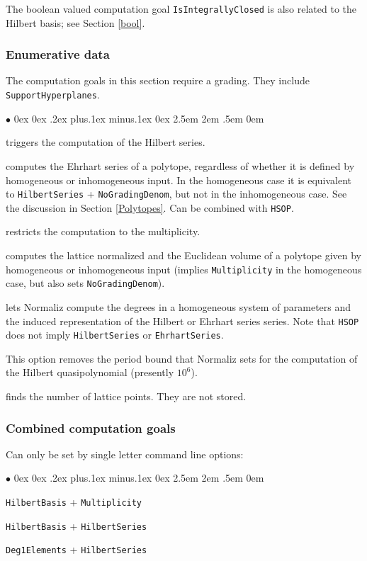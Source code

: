 \documentclass[12pt,a4paper]{scrartcl}
\newcommand{\stdli}{ \topsep0ex \partopsep0ex %
\parsep.2ex plus.1ex minus.1ex \itemsep0ex%
\leftmargin2.5em \labelwidth2em \labelsep.5em \rightmargin0em}%
\renewenvironment{itemize}{\begin{list}{{$\bullet$}}{\stdli}}{\end{list}}
\theoremstyle{definition}
\def\itemtt[#1]{\item[\textbf{\ttt{#1}}]}
\def\ttt{\texttt}
\begin{document}
The boolean valued computation goal \verb|IsIntegrallyClosed| is also related to the Hilbert basis; see Section \ref{bool}.

\subsubsection{Enumerative data}

The computation goals in this section require a grading. They include \verb|SupportHyperplanes|.

\begin{itemize}
	\itemtt [HilbertSeries,-q] triggers the computation of the Hilbert series.
	
	\itemtt[EhrhartSeries] computes the Ehrhart series of a polytope, regardless of whether it is defined by homogeneous or inhomogeneous input. In the homogeneous case it is equivalent to \verb|HilbertSeries| + \verb|NoGradingDenom|, but not in the inhomogeneous case. See the discussion in Section \ref{Polytopes}. Can be combined with \verb|HSOP|.
	
	\itemtt[Multiplicity, -v] restricts the computation to the multiplicity.
	
	\itemtt[Volume, -V] computes the lattice normalized and the Euclidean volume of a polytope given by homogeneous or inhomogeneous input (implies \verb|Multiplicity| in the homogeneous case, but also sets \verb|NoGradingDenom|). 
	
	\itemtt[HSOP] lets Normaliz compute the degrees in a homogeneous system of parameters and the induced representation of the Hilbert or Ehrhart series  series. Note that \ttt{HSOP} does not imply \ttt{HilbertSeries} or \ttt{EhrhartSeries}.
	
	\itemtt[NoPeriodBound] This option removes the period bound that Normaliz sets for the computation of the Hilbert quasipolynomial (presently $10^6$).
	
	\itemtt[NumberLatticePoints] finds the number of lattice points. They are not stored.
\end{itemize}

\subsubsection{Combined computation goals}

Can only be set by single letter command line options:

\begin{itemize}
	\itemtt[-n] \verb|HilbertBasis| + \verb|Multiplicity|
	
	\itemtt[-h] \verb|HilbertBasis| +  \verb|HilbertSeries|
	
	\itemtt[-p] \verb|Deg1Elements| +  \verb|HilbertSeries|
	
\end{itemize}
\end{document}
